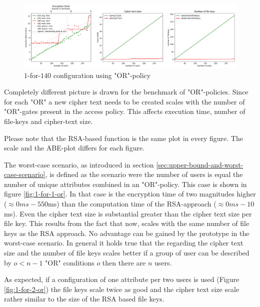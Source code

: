 \begin{figure}[!t]
\centering
    \includegraphics[width=\linewidth]{img/eval-or-policy/encrypt_incrementing_10_attribute_increment_1per140User.png}
    \caption{$1$-for-$140$ configuration using "OR"-policy}
    \label{fig:1-for-140-or}
\end{figure}

Completely different picture is drawn for the benchmark of "OR"-policies. Since for each "OR" a new cipher text needs to be created \name scales with the number of "OR"-gates present in the access policy. This affects execution time, number of file-keys and cipher-text size.




Please note that the RSA-based function is the same plot in every figure. The scale and the ABE-plot differs for each figure.  

The worst-case scenario, as introduced in section \ref{sec:upper-bound-and-worst-case-scenario}, is defined as the scenario were the number of users is equal the number of unique attributes combined in an "OR"-policy. This case is shown in figure \ref{fig:1-for-1-or}. In that case is the encryption time of \name two magnitudes higher ($\approx 0ms-550$ms) than the computation time of the RSA-approach ($\approx 0ms-10$ms). Even the cipher text size is substantial greater than the cipher text size per file key. This results from the fact that now, \name scales with the same number of file keys as the RSA approach. No advantage can be gained by the prototype in the worst-case scenario. In general it holds true that the regarding the cipher text size and the number of file keys \name scales better if a group of user can be described by $o < n -1$ "OR" conditions $o$ then there are $n$ users.

As expected, if a configuration of one attribute per two users is used (Figure \ref{fig:1-for-2-or}) the file keys scale twice as good and the cipher text size scale rather similar to the size of the RSA based file keys. 

